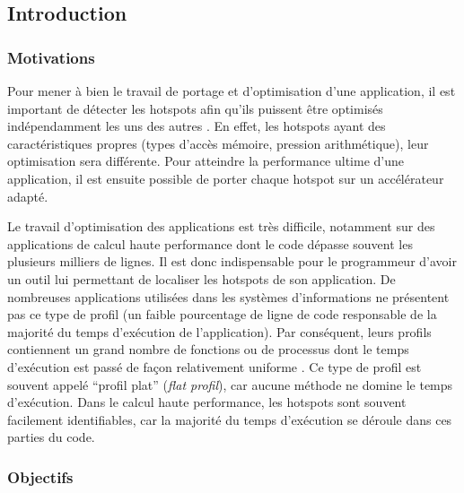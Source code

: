 \subsection{Introduction}


    \subsubsection{Motivations}

        
        Pour mener à bien le travail de portage et d'optimisation d’une application, il est important de détecter les \glspl{hotspot} afin qu'ils puissent être optimisés indépendamment les uns des autres \cite{popov:tel-01412638}. En effet, les \glspl{hotspot} ayant des caractéristiques propres (types d'accès mémoire, pression arithmétique), leur optimisation sera différente. Pour atteindre la performance ultime d’une application, il est ensuite possible de porter chaque \gls{hotspot} sur un accélérateur adapté.
        
         Le travail d'optimisation des applications est très difficile, notamment sur des applications de calcul haute performance dont le code dépasse souvent les plusieurs milliers de lignes. Il est donc indispensable pour le programmeur d'avoir un outil lui permettant de localiser les \glspl{hotspot} de son application.
         De nombreuses applications utilisées dans les systèmes d'informations ne présentent pas ce type de profil (un faible pourcentage de ligne de code responsable de la majorité du temps d'exécution de l'application). Par conséquent, leurs profils contiennent un grand nombre de fonctions ou de processus dont le temps d'exécution est passé de façon relativement uniforme \cite{Amaral2015}. Ce type de profil est souvent appelé ``profil plat'' (\textit{flat profil}), car aucune méthode ne domine le temps d'exécution. Dans le calcul haute performance, les \glspl{hotspot} sont souvent facilement identifiables, car la majorité du temps d'exécution se déroule dans ces parties du code. 
        
       
        

    
    \subsubsection{Objectifs}

